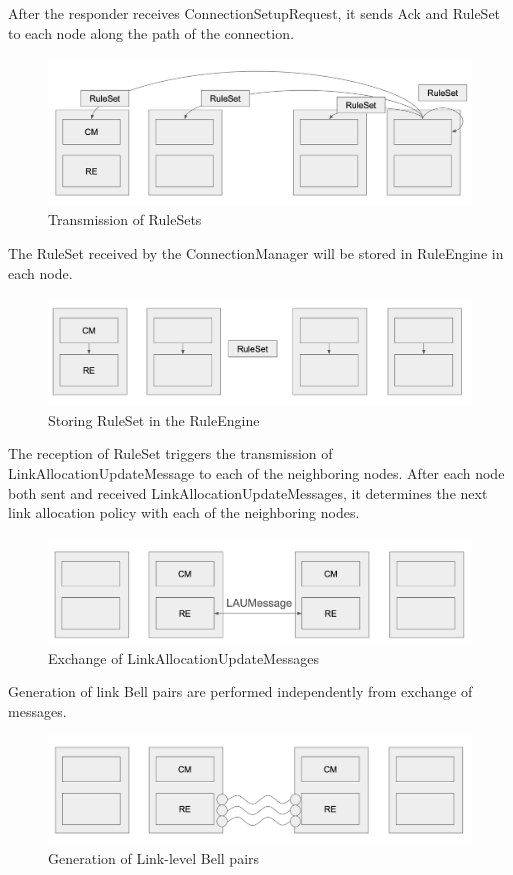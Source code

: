 After the responder receives ConnectionSetupRequest, it sends Ack and RuleSet to each node along the path of the connection.
\begin{figure}[H]
  \centerline{\includegraphics[width=\columnwidth]{images/ack_and_ruleset.png}}
  \caption{Transmission of RuleSets}
\end{figure}

The RuleSet received by the ConnectionManager will be stored in RuleEngine in each node.
\begin{figure}[H]
  \centerline{\includegraphics[width=0.7\columnwidth]{images/ruleset_in_rule_engine.png}}
  \caption{Storing RuleSet in the RuleEngine}
\end{figure}

The reception of RuleSet triggers the transmission of LinkAllocationUpdateMessage to each of the neighboring nodes.
After each node both sent and received LinkAllocationUpdateMessages, it determines the next link allocation policy with each of the neighboring nodes.
\begin{figure}[H]
  \centerline{\includegraphics[width=\columnwidth]{images/lau_negotiation.png}}
  \caption{Exchange of LinkAllocationUpdateMessages}
\end{figure}

Generation of link Bell pairs are performed independently from exchange of messages.
\begin{figure}[H]
  \centerline{\includegraphics[width=\columnwidth]{images/bell_pair_generation.png}}
  \caption{Generation of Link-level Bell pairs}
\end{figure}

